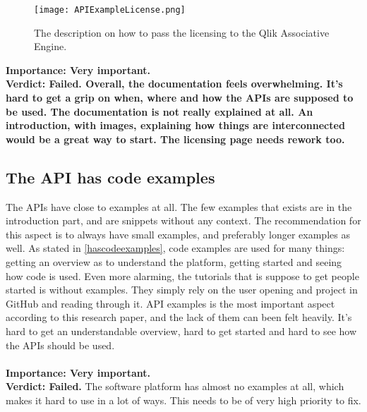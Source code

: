 \documentclass{cslthse-msc}
\begin{document}
    \begin{figure}[H]
        \centering
        \texttt{[image: APIExampleLicense.png]}
        \caption{The description on how to pass the licensing to the Qlik Associative Engine.}
        \label{fig:APIlicenese}
    \end{figure}
    \textbf{Importance: Very important.}\\
    \textbf{Verdict: Failed. Overall, the documentation feels overwhelming. It's hard to get a grip on when, where and how the APIs are supposed to be used. The documentation is not really explained at all. An introduction, with images, explaining how things are interconnected would be a great way to start. The licensing page needs rework too.}
    \subsection{The API has code examples}
    The APIs have close to  examples at all. The few examples that exists are in the introduction part, and are snippets without any context. The recommendation for this aspect is to always have small examples, and preferably longer examples as well. As stated in \ref{hascodeexamples}, code examples are used for many things: getting an overview as to understand the platform, getting started and seeing how code is used. Even more alarming, the tutorials that is suppose to get people started is without examples. They simply rely on the user opening and project in GitHub and reading through it. API examples is the most important aspect according to this research paper, and the lack of them can been felt heavily. It's hard to get an understandable overview, hard to get started and hard to see how the APIs should be used.\\ \\
    \textbf{Importance: Very important.} \\
    \textbf{Verdict: Failed.} The software platform has almost no examples at all, which makes it hard to use in a lot of ways. This needs to be of very high priority to fix.
\end{document}
